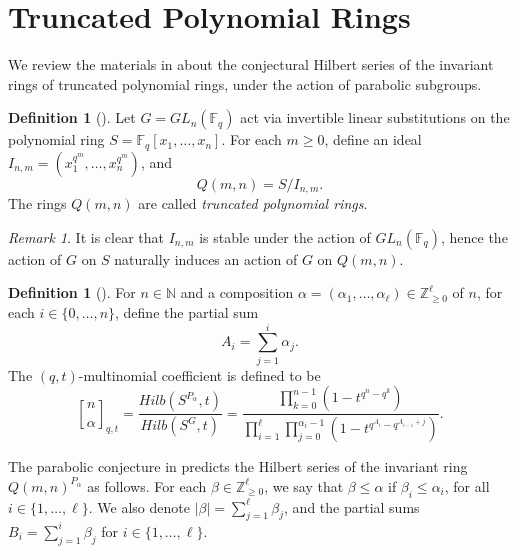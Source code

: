 \documentclass[12pt,a4paper]{report}
\theoremstyle{definition}
\newtheorem{definition}[theorem]{Definition}
\theoremstyle{remark}
\newtheorem*{remark}{Remark}
\theoremstyle{definition}
\begin{document}
\section{Truncated Polynomial Rings}\label{sec:truncated_rings}
We review the materials in \cite{Lewis_Reiner_Stanton_2017} about the conjectural Hilbert series of the invariant rings of truncated polynomial rings, under the action of parabolic subgroups.\smallbreak
\begin{definition}[{\cite[Section 1]{Lewis_Reiner_Stanton_2017}}]\label{def:truncated_rings}
Let $G = GL_n(\mathbb{F}_q)$ act via invertible linear substitutions on the polynomial ring $S=\mathbb{F}_q[x_1, \ldots, x_n]$. For each $m\geq 0$, define an ideal
$I_{n, m} = (x_1^{q^m}, \ldots, x_n^{q^m})$, and 
\begin{equation*}
    Q(m, n) = S/I_{n, m}.
\end{equation*}
The rings $Q(m, n)$ are called \emph{truncated polynomial rings}.
\end{definition}
\begin{remark}
    It is clear that $I_{n, m}$ is stable under the action of $GL_n(\mathbb{F}_q)$, hence the action of $G$ on $S$ naturally induces an action of $G$ on $Q(m, n)$.
\end{remark}
\begin{definition}[{\cite{reiner_qt-analogues_2010}}]\label{def:q_t_multinomial_coefficient}
    For $n\in \mathbb{N}$ and a composition $\alpha = (\alpha_1, \ldots, \alpha_{\ell})\in \mathbb{Z}_{\geq 0}^{\ell}$ of $n$, for each $i\in \{0, \ldots, n\}$, define the partial sum
    \begin{equation*}
        A_i = \sum\limits_{j=1}^{i}\alpha_j.
    \end{equation*}
    The $(q, t)$-multinomial coefficient is defined to be
    \begin{equation*}
    \genfrac{[}{]}{0pt}{}{n}{\alpha}_{q, t} = \dfrac{Hilb(S^{P_{\alpha}}, t)}{Hilb(S^{G}, t)} = \dfrac{\prod\limits_{k=0}^{n-1}\left(1-t^{q^n-q^k}\right)}{\prod\limits_{i=1}^{\ell}\prod\limits_{j=0}^{\alpha_i-1}\left(1-t^{q^{A_i} - q^{A_{i-1}+j}}\right)}.
    \end{equation*}
\end{definition}
The parabolic conjecture in \cite{Lewis_Reiner_Stanton_2017} predicts the Hilbert series of the invariant ring $Q(m, n)^{P_{\alpha}}$ as follows. For each $\beta \in \mathbb{Z}_{\geq 0}^{\ell}$, we say that $\beta\leq \alpha$ if $\beta_i\leq \alpha_i$, for all $i\in \{1, \ldots, \ell\}$. We also denote $|\beta| = \sum\limits_{j=1}^{\ell}\beta_j$, and the partial sums $B_i = \sum\limits_{j=1}^{i}\beta_j$ for $i\in \{1, \ldots, \ell\}$. 
\end{document}
